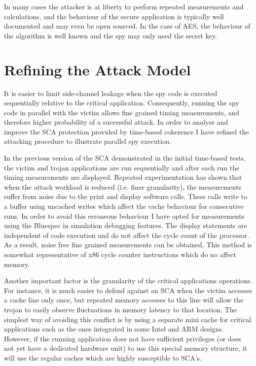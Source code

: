 		In many cases the attacker is at liberty to perform repeated measurements and calculations, and the behaviour of the secure application is typically well documented and may even be open sourced. In the case of AES, the behaviour of the algorithm is well known and the spy may only need the secret key.
		
\section{Refining the Attack Model}
	It is easier to limit side-channel leakage when the spy code is executed sequentially relative to the critical application. Consequently, running the spy code in parallel with the victim allows fine grained timing measurements, and therefore higher probability of a successful attack. In order to analyse and improve the SCA protection provided by time-based coherence I have refined the attacking procedure to illustrate parallel spy execution.
	
	In the previous version of the SCA demonstrated in the initial time-based tests, the victim and trojan applications are run sequentially and after each run the timing measurements are displayed. Repeated experimentation has shown that when the attack workload is reduced (i.e. finer granularity), the measurements suffer from noise due to the print and display software calls. These calls write to a buffer using uncached writes which affect the cache behaviour for consecutive runs. In order to avoid this erroneous behaviour I have opted for measurements using the Bluespec in simulation debugging features. The display statements are independent of code execution and do not affect the cycle count of the processor. As a result, noise free fine grained measurements can be obtained. This method is somewhat representative of x86 cycle counter instructions which do no affect memory.

	Another important factor is the granularity of the critical applications operations. For instance, it is much easier to defend against an SCA when the victim accesses a cache line only once, but repeated memory accesses to this line will allow the trojan to easily observe fluctuations in memory latency to that location. The simplest way of avoiding this conflict is by using a separate mini cache for critical applications such as the ones integrated in some Intel and ARM designs. However, if the running application does not have sufficient privileges (or does not yet have a dedicated hardware unit) to use this special memory structure, it will use the regular caches which are highly susceptible to SCA's.
	
